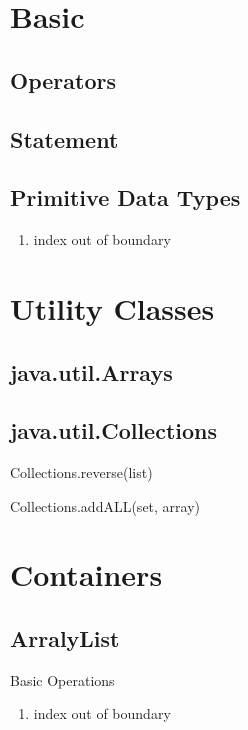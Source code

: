 \chapter{ Basic }



\section{ Operators }

\section{Statement }

\section{ Primitive Data Types }
\begin{enumerate}
    \item index out of boundary


\end{enumerate}

\chapter{ Utility Classes }

\section{java.util.Arrays}


\section{java.util.Collections}

 Collections.reverse(list)
 
 Collections.addALL(set, array)

\chapter{ Containers }

\section{ArralyList }

Basic Operations 
\begin{enumerate}
    \item index out of boundary


\end{enumerate}


